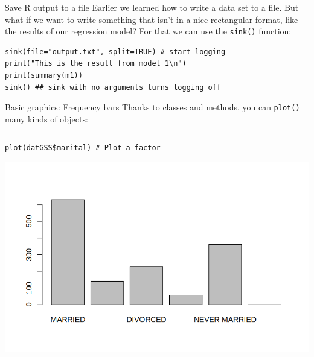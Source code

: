 \documentclass[table,smaller]{beamer}
\begin{document}
\begin{frame}[fragile,label=sec-7-6]{Save R output to a file}
 Earlier we learned how to write a data set to a file. But what if we want to write something that isn't in a nice rectangular format, like the results of our regression model? For that we can use the \verb~sink()~ function:

\begin{verbatim}
sink(file="output.txt", split=TRUE) # start logging
print("This is the result from model 1\n")
print(summary(m1))
sink() ## sink with no arguments turns logging off
\end{verbatim}
\end{frame}


\begin{frame}[fragile,label=sec-7-7]{Basic graphics: Frequency bars}
 Thanks to classes and methods, you can \verb~plot()~ many  kinds of objects:

\begin{columns}  \begin{block}{}
\begin{verbatim}
plot(datGSS$marital) # Plot a factor
\end{verbatim}
\includegraphics[width=.9\textwidth]{images/examplePlot1.png}



\end{block} \end{columns}
\end{frame}
\end{document}
